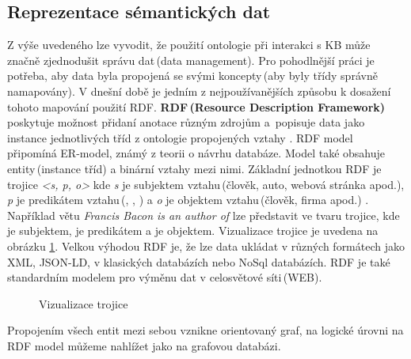 \subsection{Reprezentace sémantických dat}
\label{representationOfSemanticData}
Z výše uvedeného lze vyvodit, že použití ontologie  při interakci s KB může značně zjednodušit správu dat\,(data management). Pro pohodlnější práci je potřeba, aby data byla propojená se svými koncepty\,(aby byly třídy správně namapovány).  V dnešní době je jedním z nejpoužívanějších způsobu k dosažení tohoto mapování použití RDF. \textbf{RDF\,(Resource Description Framework)} poskytuje možnost přidaní anotace různým zdrojům \cite{handschuh2005creating} a~popisuje data jako instance jednotlivých tříd z ontologie propojených vztahy \cite{hertel2009rdf}. RDF model připomíná ER-model, známý z teorii o návrhu databáze. Model také obsahuje entity\,(instance tříd) a binární vztahy mezi nimi.  Základní jednotkou RDF je trojice \emph{<s, p, o>} kde \emph{s} je subjektem vztahu\,(člověk, auto, webová stránka apod.), \emph{p} je predikátem vztahu\,(, , ) a \emph{o} je objektem vztahu\,(člověk, firma apod.) \cite{decker2000framework}.  Například větu \emph{Francis Bacon is an author of } lze představit ve tvaru trojice, kde  je subjektem,  je predikátem a  je objektem. Vizualizace trojice je uvedena na obrázku \ref{tripleVisualisation}. Velkou výhodou RDF je,  že lze data ukládat v různých formátech jako XML, JSON-LD, v klasických databázích \cite{hertel2009rdf} nebo NoSql databázích. RDF je také standardním modelem pro výměnu dat v celosvětové síti\,(WEB). 
\begin{figure}[H]
\centering
{}
\caption{Vizualizace trojice}
\label{tripleVisualisation}
\end{figure}
Propojením všech entit mezi sebou vznikne orientovaný graf, na logické úrovni na RDF model můžeme nahlížet jako na grafovou databázi. 

